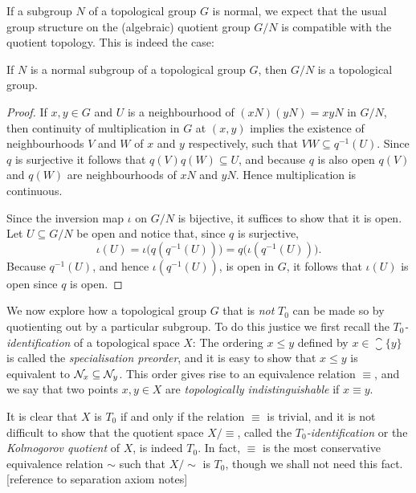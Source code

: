 \documentclass[article, a4paper, 11pt, oneside]{memoir}
\numberwithin{equation}{chapter}
\newcommand{\preim}{^{-1}}
\begin{document}
If a subgroup $N$ of a topological group $G$ is normal, we expect that the usual group structure on the (algebraic) quotient group $G/N$ is compatible with the quotient topology. This is indeed the case:

\begin{theorem}
    \label{thm:topological-quotient-group}
    If $N$ is a normal subgroup of a topological group $G$, then $G/N$ is a topological group.
\end{theorem}

\begin{proof}
    If $x,y \in G$ and $U$ is a neighbourhood of $(xN)(yN) = xyN$ in $G/N$, then continuity of multiplication in $G$ at $(x,y)$ implies the existence of neighbourhoods $V$ and $W$ of $x$ and $y$ respectively, such that $VW \subseteq q\preim(U)$. Since $q$ is surjective it follows that $q(V) q(W) \subseteq U$, and because $q$ is also open $q(V)$ and $q(W)$ are neighbourhoods of $xN$ and $yN$. Hence multiplication is continuous.

    Since the inversion map $\iota$ on $G/N$ is bijective, it suffices to show that it is open. Let $U \subseteq G/N$ be open and notice that, since $q$ is surjective,
    \begin{equation*}
        \iota(U)
            = \iota \bigl( q(q\preim(U)) \bigr)
            = q \bigl( \iota(q\preim(U)) \bigr).
    \end{equation*}
    Because $q\preim(U)$, and hence $\iota(q\preim(U))$, is open in $G$, it follows that $\iota(U)$ is open since $q$ is open.
\end{proof}

We now explore how a topological group $G$ that is \emph{not} $T_0$ can be made so by quotienting out by a particular subgroup. To do this justice we first recall the \emph{$T_0$-identification} of a topological space $X$: The ordering $x \leq y$ defined by $x \in \closure{\{y\}}$ is called the \emph{specialisation preorder}, and it is easy to show that $x \leq y$ is equivalent to $\mathcal{N}_{x} \subseteq \mathcal{N}_{y}$. This order gives rise to an equivalence relation $\equiv$, and we say that two points $x,y \in X$ are \emph{topologically indistinguishable} if $x \equiv y$.

It is clear that $X$ is $T_0$ if and only if the relation $\equiv$ is trivial, and it is not difficult to show that the quotient space $X/{\equiv}$, called the \emph{$T_0$-identification} or the \emph{Kolmogorov quotient} of $X$, is indeed $T_0$. In fact, $\equiv$ is the most conservative equivalence relation $\sim$ such that $X/{\sim}$ is $T_0$, though we shall not need this fact. [reference to separation axiom notes]
\end{document}

